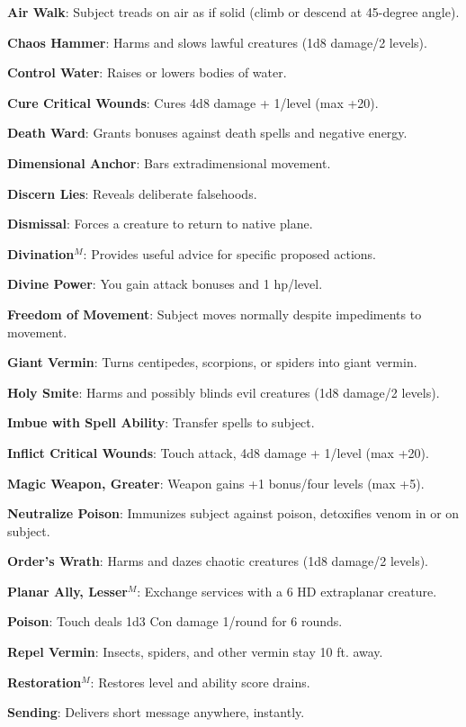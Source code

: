 \textbf{Air Walk}: Subject treads on air as if solid (climb or descend at 45-degree angle).

\textbf{Chaos Hammer}: Harms and slows lawful creatures (1d8 damage/2 levels).

\textbf{Control Water}: Raises or lowers bodies of water.

\textbf{Cure Critical Wounds}: Cures 4d8 damage + 1/level (max +20).

\textbf{Death Ward}: Grants bonuses against death spells and negative energy.

\textbf{Dimensional Anchor}: Bars extradimensional movement.

\textbf{Discern Lies}: Reveals deliberate falsehoods.

\textbf{Dismissal}: Forces a creature to return to native plane.

\textbf{Divination}\(^{M}\): Provides useful advice for specific proposed actions.

\textbf{Divine Power}: You gain attack bonuses and 1 hp/level.

\textbf{Freedom of Movement}: Subject moves normally despite impediments to movement.

\textbf{Giant Vermin}: Turns centipedes, scorpions, or spiders into giant vermin.

\textbf{Holy Smite}: Harms and possibly blinds evil creatures (1d8 damage/2 levels).

\textbf{Imbue with Spell Ability}: Transfer spells to subject.

\textbf{Inflict Critical Wounds}: Touch attack, 4d8 damage + 1/level (max +20).

\textbf{Magic Weapon, Greater}: Weapon gains +1 bonus/four levels (max +5).

\textbf{Neutralize Poison}: Immunizes subject against poison, detoxifies venom in or on subject.

\textbf{Order's Wrath}: Harms and dazes chaotic creatures (1d8 damage/2 levels).

\textbf{Planar Ally, Lesser}\(^{M}\): Exchange services with a 6 HD extraplanar creature.

\textbf{Poison}: Touch deals 1d3 Con damage 1/round for 6 rounds.

\textbf{Repel Vermin}: Insects, spiders, and other vermin stay 10 ft. away.

\textbf{Restoration}\(^{M}\): Restores level and ability score drains.

\textbf{Sending}: Delivers short message anywhere, instantly.

